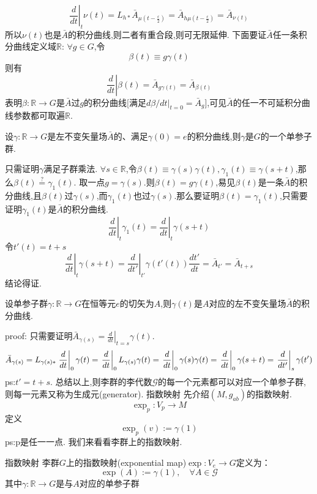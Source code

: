 \documentclass[../main.tex]{subfiles}
\begin{document}
    $$ \left.\frac{d}{dt}\right|_{t}\nu(t) = L_{h*} \bar{A}_{\mu(t - \frac{\varepsilon}{2})_{}} = \bar{A}_{h\mu(t - \frac{\varepsilon}{2})} = \bar{A}_{\nu(t)} $$
所以$\nu(t)$也是$\bar{A}$的积分曲线,则二者有重合段,则可无限延伸.
下面要证$\bar{A}$任一条积分曲线定义域$\mathbb{R}$:
$\forall g \in G$,令
    $$ \beta(t) \equiv g\gamma(t) $$
则有
    $$ \left.\frac{d}{dt}\right|\beta(t) = \bar{A}_{g\gamma(t)} = \bar{A}_{\beta(t)} $$
表明$\beta :\mathbb{R} \rightarrow G$是$\bar{A}$过$g$的积分曲线[满足$d\beta/dt|_{t=0} = \bar{A}_g$],可见$\bar{A}$的任一不可延积分曲线参数都可取遍$\mathbb{R}$.
\begin{theorem}
    设$\gamma:\mathbb{R} \rightarrow G$是左不变矢量场$\bar{A}$的、满足$\gamma(0) = e$的积分曲线,则$\gamma$是$G$的一个单参子群.
\end{theorem}
只需证明$\gamma$满足子群乘法.
$\forall s \in \mathbb{R}$,令$\beta(t) \equiv \gamma(s)\gamma(t), \gamma_1(t) \equiv \gamma(s+t)$,那么$ \beta(t)\stackrel{?}{=}\gamma_1(t)$.
取一点$g = \gamma(s)$.则$\beta(t) = g\gamma(t)$,易见$\beta(t)$是一条$\bar{A}$的积分曲线,且$\beta(t)$过$\gamma(s)$,而$\gamma_1(t)$也过$\gamma(s)$.那么要证明$\beta(t) = \gamma_1(t)$,只需要证明$\gamma_1(t)$是$\bar{A}$的积分曲线.
    $$ \left.\frac{d}{dt}\right|_t\gamma_1(t) = \left.\frac{d}{dt}\right|_t\gamma(s + t) $$
令$t'(t) = t + s$
    $$ \left.\frac{d}{dt}\right|_t\gamma(s + t) = \left.\frac{d}{dt'}\right|_{t'}\gamma(t'(t))\frac{dt'}{dt} = \bar{A}_{t'} = \bar{A}_{t + s} $$
结论得证.
\begin{theorem}
    设单参子群$\gamma : \mathbb{R} \rightarrow G$在恒等元$e$的切矢为$A$,则$\gamma(t)$是$A$对应的左不变矢量场$\bar{A}$的积分曲线.
\end{theorem}
proof: 只需要证明$\bar{A}_{\gamma(s)} = \left.\frac{d}{dt}\right|_{t=s}\gamma(t)$.
$$ \bar{A}_{\gamma(s)} = L_{\gamma(s)*}\left.\frac{d}{dt}\right|_0\gamma(t) =\left.\frac{d}{dt}\right|_0L_{\gamma(s)}\gamma(t)\\ =\left.\frac{d}{dt}\right|_0\gamma(s)\gamma(t)=\left.\frac{d}{dt}\right|_0\gamma(s+t) \\= \left.\frac{d}{dt'}\right|_s\gamma(t') $$
ps:$t'=t+s$.
总结以上,则李群的李代数$\mathscr{G}$的每一个元素都可以对应一个单参子群,则每一元素又称为生成元(generator).
\vspace{1cm}
{\LARGE 指数映射}
先介绍$(M,g_{ab})$的指数映射.
    $$ \exp_p : V_p \rightarrow M $$
定义
    $$ \exp_p(v):=\gamma(1) $$
ps:p是任一一点.
我们来看看李群上的指数映射.
\begin{definition}{}{指数映射}
    李群$G$上的指数映射(exponential map)$\exp:V_e\rightarrow G$定义为：
        $$ \exp(A):=\gamma(1),\quad \forall A \in \mathscr{G} $$
    其中$\gamma : \mathbb{R} \rightarrow G$是与$A$对应的单参子群
\end{definition}
\end{document}
